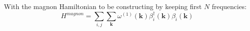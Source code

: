 \documentclass[a4paper,12pt]{article}
\begin{document}
            With the magnon Hamiltonian to be constructing by keeping first $N$ frequencies:
            \begin{equation}
                H^{magnon} = \sum_{i,j}\sum_{\boldsymbol{k}}\omega^{(1)}(\boldsymbol{k})\beta^{\dag}_i(\boldsymbol{k})\beta_i(\boldsymbol{k})
            \end{equation}
 
    

    

     
     



\end{document}
